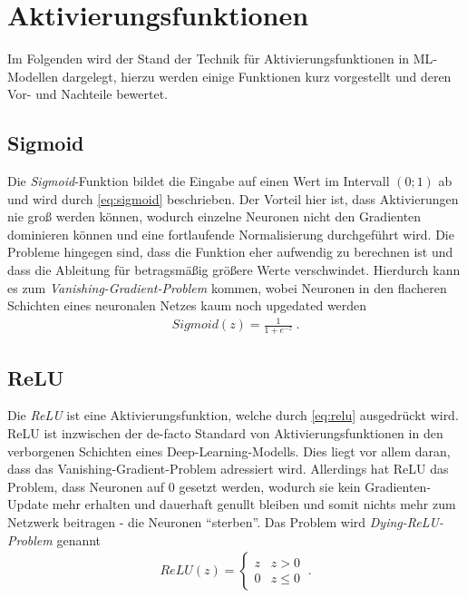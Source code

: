 \section{Aktivierungsfunktionen} \label{sec:activation}

Im Folgenden wird der Stand der Technik für Aktivierungsfunktionen in \ac{ML}-Modellen dargelegt,
hierzu werden einige Funktionen kurz vorgestellt und deren Vor- und Nachteile bewertet. 

\subsection{Sigmoid}

Die \textit{Sigmoid}-Funktion bildet die Eingabe auf einen Wert im Intervall $(0;1)$ ab und wird durch \autoref{eq:sigmoid} beschrieben.
Der Vorteil hier ist, dass Aktivierungen nie groß werden können, wodurch einzelne Neuronen nicht den Gradienten dominieren können und 
eine fortlaufende Normalisierung durchgeführt wird. Die Probleme hingegen sind, dass die Funktion eher aufwendig zu berechnen ist 
und dass die Ableitung für betragsmäßig größere Werte verschwindet. Hierdurch kann es zum \textit{Vanishing-Gradient-Problem} kommen, wobei 
Neuronen in den flacheren Schichten eines neuronalen Netzes kaum noch upgedated werden \cite{Goodfellow.2016} 
\begin{align}
	\label{eq:sigmoid} Sigmoid(z) = \frac{1}{1+e^{-z}}~.
\end{align} 

\subsection{\acf{ReLU}} \label{sec:activation:relu}

Die \textit{\acf{ReLU}} ist eine Aktivierungsfunktion, welche durch \autoref{eq:relu} ausgedrückt wird. 
\ac{ReLU} ist inzwischen der de-facto Standard von Aktivierungsfunktionen in den verborgenen Schichten eines Deep-Learning-Modells.
Dies liegt vor allem daran, dass das Vanishing-Gradient-Problem adressiert wird. Allerdings hat \ac{ReLU} das Problem, 
dass Neuronen auf $0$ gesetzt werden, wodurch sie kein Gradienten-Update mehr erhalten und dauerhaft genullt bleiben 
und somit nichts mehr zum Netzwerk beitragen - die Neuronen \enquote{sterben}. Das Problem wird \textit{Dying-\ac{ReLU}-Problem} genannt \cite{Goodfellow.2016} 
\begin{align}
	\label{eq:relu} ReLU(z) = \begin{cases} 
		z & z > 0 \\
		0 & z \leq 0 
	\end{cases}~.
\end{align} 

